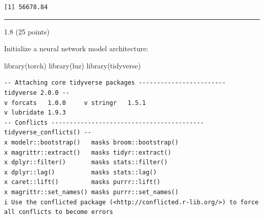 \documentclass[
  letterpaper,
  DIV=11,
  numbers=noendperiod]{scrartcl}
\newenvironment{Shaded}{\begin{snugshade}}{\end{snugshade}}
\newcommand{\AttributeTok}[1]{\textcolor[rgb]{0.40,0.45,0.13}{#1}}
\newcommand{\ControlFlowTok}[1]{\textcolor[rgb]{0.00,0.23,0.31}{#1}}
\newcommand{\DecValTok}[1]{\textcolor[rgb]{0.68,0.00,0.00}{#1}}
\newcommand{\FunctionTok}[1]{\textcolor[rgb]{0.28,0.35,0.67}{#1}}
\newcommand{\NormalTok}[1]{\textcolor[rgb]{0.00,0.23,0.31}{#1}}
\newcommand{\OtherTok}[1]{\textcolor[rgb]{0.00,0.23,0.31}{#1}}
\newcommand{\SpecialCharTok}[1]{\textcolor[rgb]{0.37,0.37,0.37}{#1}}
\begin{document}
\begin{verbatim}
[1] 56678.84
\end{verbatim}

\begin{center}\rule{0.5\linewidth}{0.5pt}\end{center}

1.8 (25 points)

Initialize a neural network model architecture:

\begin{Shaded}
\begin{Highlighting}[]
\FunctionTok{library}\NormalTok{(torch)}
\FunctionTok{library}\NormalTok{(luz)}
\FunctionTok{library}\NormalTok{(tidyverse)}
\end{Highlighting}
\end{Shaded}

\begin{verbatim}
-- Attaching core tidyverse packages ------------------------ tidyverse 2.0.0 --
v forcats   1.0.0     v stringr   1.5.1
v lubridate 1.9.3     
-- Conflicts ------------------------------------------ tidyverse_conflicts() --
x modelr::bootstrap()   masks broom::bootstrap()
x magrittr::extract()   masks tidyr::extract()
x dplyr::filter()       masks stats::filter()
x dplyr::lag()          masks stats::lag()
x caret::lift()         masks purrr::lift()
x magrittr::set_names() masks purrr::set_names()
i Use the conflicted package (<http://conflicted.r-lib.org/>) to force all conflicts to become errors
\end{verbatim}

\begin{Shaded}
\end{Shaded}
\end{document}
